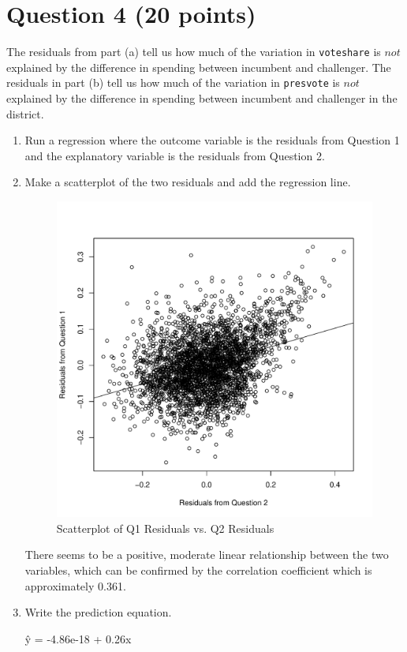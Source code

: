 \documentclass[12pt,letterpaper]{article}
\begin{document}
	
\section*{Question 4 (20 points)}
\noindent The residuals from part (a) tell us how much of the variation in \texttt{voteshare} is $not$ explained by the difference in spending between incumbent and challenger. The residuals in part (b) tell us how much of the variation in \texttt{presvote} is $not$ explained by the difference in spending between incumbent and challenger in the district.
	\begin{enumerate}
		\item Run a regression where the outcome variable is the residuals from Question 1 and the explanatory variable is the residuals from Question 2.
		
		
				
		\item Make a scatterplot of the two residuals and add the regression line.
		
		
		
			\begin{figure} [h]
			\centering
			\includegraphics[width=0.7\linewidth]{plotq4.pdf}
			\caption{Scatterplot of Q1 Residuals vs. Q2 Residuals}
			\label{fig:graph2}
		\end{figure}
	
		There seems to be a positive, moderate linear relationship between the two variables, which can be confirmed by the correlation coefficient which is approximately 0.361.
		
		\item Write the prediction equation.
		
		\^{y} = -4.86e-18 + 0.26x
		
	\end{enumerate}
\end{document}
